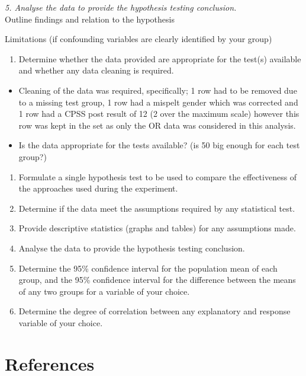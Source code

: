 \documentclass[
  10pt,
]{article}
\providecommand{\tightlist}{%
  \setlength{\itemsep}{0pt}\setlength{\parskip}{0pt}}
\begin{document}
\emph{5. Analyse the data to provide the hypothesis testing
conclusion.}\\

Outline findings and relation to the hypothesis

Limitations (if confounding variables are clearly identified by your
group)

\begin{enumerate}
\def\labelenumi{\arabic{enumi}.}
\tightlist
\item
  Determine whether the data provided are appropriate for the test(s)
  available and whether any data cleaning is required.
\end{enumerate}

\begin{itemize}
\tightlist
\item
  Cleaning of the data was required, specifically; 1 row had to be
  removed due to a missing test group, 1 row had a mispelt gender which
  was corrected and 1 row had a CPSS post result of 12 (2 over the
  maximum scale) however this row was kept in the set as only the OR
  data was considered in this analysis.
\item
  Is the data appropriate for the tests available? (is 50 big enough for
  each test group?)
\end{itemize}

\begin{enumerate}
\def\labelenumi{\arabic{enumi}.}
\setcounter{enumi}{1}
\item
  Formulate a single hypothesis test to be used to compare the
  effectiveness of the approaches used during the experiment.
\item
  Determine if the data meet the assumptions required by any statistical
  test.
\item
  Provide descriptive statistics (graphs and tables) for any assumptions
  made.
\item
  Analyse the data to provide the hypothesis testing conclusion.
\item
  Determine the 95\% confidence interval for the population mean of each
  group, and the 95\% confidence interval for the difference between the
  means of any two groups for a variable of your choice.
\item
  Determine the degree of correlation between any explanatory and
  response variable of your choice.
\end{enumerate}

\hypertarget{references}{%
\section{References}\label{references}}
\end{document}
